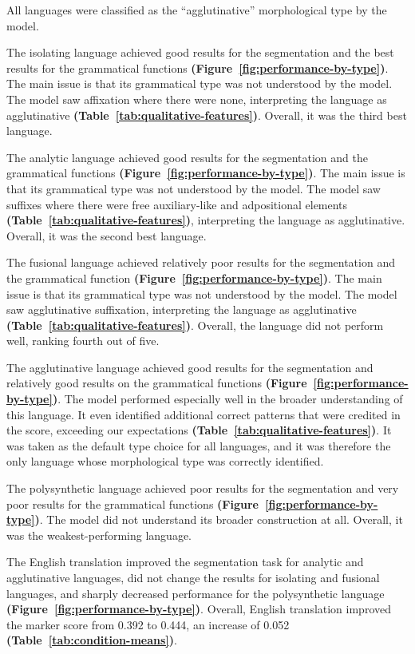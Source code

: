\documentclass[11pt]{article}
\begin{document}
All languages were classified as the ``agglutinative'' morphological type by the model.

The isolating language achieved good results for the segmentation and the best results for the grammatical functions \textbf{(Figure~\ref{fig:performance-by-type})}. The main issue is that its grammatical type was not understood by the model. The model saw affixation where there were none, interpreting the language as agglutinative \textbf{(Table~\ref{tab:qualitative-features})}. Overall, it was the third best language.

The analytic language achieved good results for the segmentation and the grammatical functions \textbf{(Figure~\ref{fig:performance-by-type})}. The main issue is that its grammatical type was not understood by the model. The model saw suffixes where there were free auxiliary-like and adpositional elements \textbf{(Table~\ref{tab:qualitative-features})}, interpreting the language as agglutinative. Overall, it was the second best language.~

The fusional language achieved relatively poor results for the segmentation and the grammatical function \textbf{(Figure~\ref{fig:performance-by-type})}. The main issue is that its grammatical type was not understood by the model. The model saw agglutinative suffixation, interpreting the language as agglutinative \textbf{(Table~\ref{tab:qualitative-features})}. Overall, the language did not perform well, ranking fourth out of five.~

The agglutinative language achieved good results for the segmentation and relatively good results on the grammatical functions \textbf{(Figure~\ref{fig:performance-by-type})}. The model performed especially well in the broader understanding of this language. It even identified additional correct patterns that were credited in the score, exceeding our expectations \textbf{(Table~\ref{tab:qualitative-features})}. It was taken as the default type choice for all languages, and it was therefore the only language whose morphological type was correctly identified.

The polysynthetic language achieved poor results for the segmentation and very poor results for the grammatical functions \textbf{(Figure~\ref{fig:performance-by-type})}. The model did not understand its broader construction at all. Overall, it was the weakest-performing language.~

The English translation improved the segmentation task for analytic and agglutinative languages, did not change the results for isolating and fusional languages, and sharply decreased performance for the polysynthetic language \textbf{(Figure~\ref{fig:performance-by-type})}. Overall, English translation improved the marker score from 0.392 to 0.444, an increase of 0.052 \textbf{(Table~\ref{tab:condition-means})}.
\end{document}
